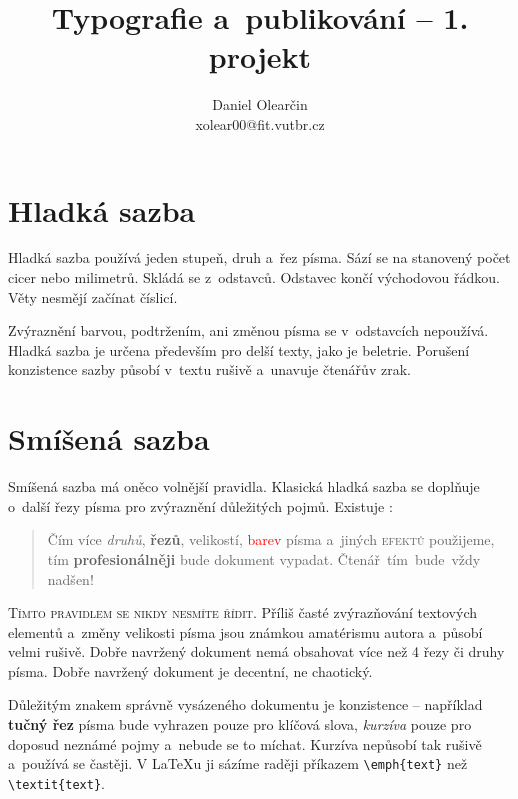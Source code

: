\documentclass[a4paper, 10pt, twocolumn] {article}
\begin{document}
\title{Typografie a~publikování -- 1. projekt}
\author{Daniel Olearčin \\ xolear00@fit.vutbr.cz}
\date{}

\maketitle


\section{Hladká sazba}
Hladká sazba používá jeden stupeň, druh a~řez písma.
Sází se na stanovený počet cicer nebo milimetrů.
Skládá se z~odstavců. Odstavec končí východovou řádkou.
Věty nesmějí začínat číslicí.

Zvýraznění barvou, podtržením, ani změnou písma se v~odstavcích nepoužívá.
Hladká sazba je určena především pro delší texty, jako je beletrie.
Porušení konzistence sazby působí v~textu rušivě a~unavuje čtenářův zrak.

\section{Smíšená sazba} 

Smíšená sazba má oněco volnější pravidla.
Klasická hladká sazba se doplňuje o~další řezy písma pro zvýraznění důležitých pojmů.
Existuje :
\begin{quotation}
Čím více \textit{druhů}, \textbf{řezů}, {\scriptsize velikostí}, \textcolor{red}{barev} písma a~jiných \textsc{efektů} použijeme, tím {\small \textbf{profesionálněji}} bude {\Large{}\selectfont dokument} vypadat.
{\huge Č}{\LARGE t}{\Large }{\large e}n{\small á}{\footnotesize ř}~tím~bude~vždy~ {\Huge nadšen!}
\end{quotation}

\textsc {Tímto pravidlem se nikdy nesmíte řídit.}
Příliš časté zvýrazňování textových elementů a~změny velikosti písma jsou známkou amatérismu autora a~působí velmi rušivě.
Dobře navržený dokument nemá obsahovat více než 4 řezy či druhy písma.
Dobře navržený dokument je decentní, ne chaotický.

Důležitým znakem správně vysázeného dokumentu je konzistence -- například \textbf{tučný řez} písma bude vyhrazen pouze pro klíčová slova, \textit{kurzíva} pouze pro doposud neznámé pojmy a~nebude se to míchat.
Kurzíva nepůsobí tak rušivě a~používá se častěji.
V \LaTeX u ji sázíme raději příkazem \verb|\emph{text}| než \verb|\textit{text}|.
\end{document}
